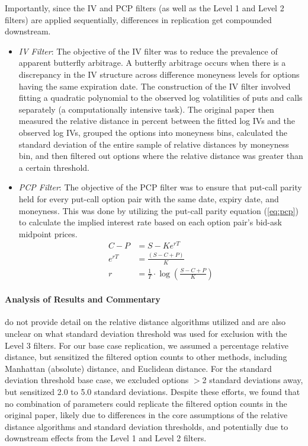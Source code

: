 Importantly, since the IV and PCP filters (as well as the Level 1 and Level 2 filters) are applied sequentially, differences in replication get compounded downstream.

\begin{itemize}
  \item \textit{IV Filter}: The objective of the IV filter was to reduce the prevalence of apparent butterfly arbitrage. A butterfly arbitrage occurs when there is a discrepancy in the IV structure across difference moneyness levels for options having the same expiration date. The construction of the IV filter involved fitting a quadratic polynomial to the observed log volatilities of puts and calls separately (a computationally intensive task). The original paper then measured the relative distance in percent between the fitted log IVs and the observed log IVs, grouped the options into moneyness bins, calculated the standard deviation of the entire sample of relative distances by moneyness bin, and then filtered out options where the relative distance was greater than a certain threshold.
  \item \textit{PCP Filter}: The objective of the PCP filter was to ensure that put-call parity held for every put-call option pair with the same date, expiry date, and moneyness. This was done by utilizing the put-call parity equation (\autoref{eq:pcp}) to calculate the implied interest rate based on each option pair's bid-ask midpoint prices.
\begin{align}
  \label{eq:pcp}
  C-P &= S-Ke^{rT} \\
  e^{rT} &= \frac{(S-C+P)}{K} \\
  r &= \frac{1}{T} \cdot \log\left(\frac{S-C+P}{K}\right)
\end{align}
\end{itemize}


\paragraph{Analysis of Results and Commentary}
\citet{constantinides2013} do not provide detail on the relative distance algorithms utilized and are also unclear on what standard deviation threshold was used for exclusion with the Level 3 filters. For our base case replication, we assumed a percentage relative distance, but sensitized the filtered option counts to other methods, including Manhattan (absolute) distance, and Euclidean distance. For the standard deviation threshold base case, we excluded options $>$2 standard deviations away, but sensitized 2.0 to 5.0 standard deviations. Despite these efforts, we found that no combination of parameters could replicate the filtered option counts in the original paper, likely due to differences in the core assumptions of the relative distance algorithms and standard deviation thresholds, and potentially due to downstream effects from the Level 1 and Level 2 filters. 


